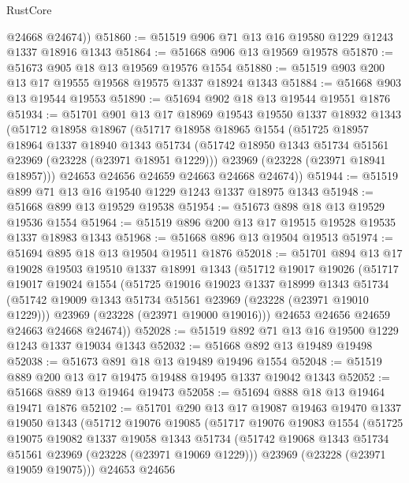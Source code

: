 \begin{lexlean}{RustCore}
\begin{coremodule}
        @24668
        @24674))
@51860 := @51519 @906 @71 @13 @16 @19580 @1229 @1243 @1337 @18916 @1343
@51864 := @51668 @906 @13 @19569 @19578
@51870 := @51673 @905 @18 @13 @19569 @19576 @1554
@51880 := @51519 @903 @200 @13 @17 @19555 @19568 @19575 @1337 @18924 @1343
@51884 := @51668 @903 @13 @19544 @19553
@51890 := @51694 @902 @18 @13 @19544 @19551 @1876
@51934 := @51701
    @901
    @13
    @17
    @18969
    @19543
    @19550
    @1337
    @18932
    @1343
    (@51712
      @18958
      @18967
      (@51717
        @18958
        @18965
        @1554
        (@51725
          @18957
          @18964
          @1337
          @18940
          @1343
          @51734
          (@51742 @18950 @1343 @51734 @51561 @23969 (@23228 (@23971 @18951 @1229)))
          @23969
          (@23228 (@23971 @18941 @18957)))
        @24653
        @24656
        @24659
        @24663
        @24668
        @24674))
@51944 := @51519 @899 @71 @13 @16 @19540 @1229 @1243 @1337 @18975 @1343
@51948 := @51668 @899 @13 @19529 @19538
@51954 := @51673 @898 @18 @13 @19529 @19536 @1554
@51964 := @51519 @896 @200 @13 @17 @19515 @19528 @19535 @1337 @18983 @1343
@51968 := @51668 @896 @13 @19504 @19513
@51974 := @51694 @895 @18 @13 @19504 @19511 @1876
@52018 := @51701
    @894
    @13
    @17
    @19028
    @19503
    @19510
    @1337
    @18991
    @1343
    (@51712
      @19017
      @19026
      (@51717
        @19017
        @19024
        @1554
        (@51725
          @19016
          @19023
          @1337
          @18999
          @1343
          @51734
          (@51742 @19009 @1343 @51734 @51561 @23969 (@23228 (@23971 @19010 @1229)))
          @23969
          (@23228 (@23971 @19000 @19016)))
        @24653
        @24656
        @24659
        @24663
        @24668
        @24674))
@52028 := @51519 @892 @71 @13 @16 @19500 @1229 @1243 @1337 @19034 @1343
@52032 := @51668 @892 @13 @19489 @19498
@52038 := @51673 @891 @18 @13 @19489 @19496 @1554
@52048 := @51519 @889 @200 @13 @17 @19475 @19488 @19495 @1337 @19042 @1343
@52052 := @51668 @889 @13 @19464 @19473
@52058 := @51694 @888 @18 @13 @19464 @19471 @1876
@52102 := @51701
    @290
    @13
    @17
    @19087
    @19463
    @19470
    @1337
    @19050
    @1343
    (@51712
      @19076
      @19085
      (@51717
        @19076
        @19083
        @1554
        (@51725
          @19075
          @19082
          @1337
          @19058
          @1343
          @51734
          (@51742 @19068 @1343 @51734 @51561 @23969 (@23228 (@23971 @19069 @1229)))
          @23969
          (@23228 (@23971 @19059 @19075)))
        @24653
        @24656

\end{coremodule}
\end{lexlean}
